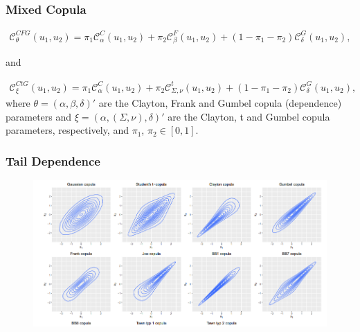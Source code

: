 \documentclass[pdf,10pt,xcolor=dvipsnames,hide notes]{beamer}
\begin{document}
\begin{frame}[label=frame4i]
\frametitle{Mixed Copula}

\begin{eqnarray*}
	\mathcal{C}_{\theta}^{CFG}\left(u_{1},u_{2}\right)=\pi_{1}\mathcal{C}_{\alpha}^{C}\left(u_{1},u_{2}\right)+\pi_{2}\mathcal{C}_{\beta}^{F}\left(u_{1},u_{2}\right)+\left(1-\pi_{1}-\pi_{2}\right)\mathcal{C}_{\delta}^{G}\left(u_{1},u_{2}\right),
\end{eqnarray*}

and

\begin{eqnarray*}
	\mathcal{C}_{\xi}^{CtG}\left(u_{1},u_{2}\right)=\pi_{1}\mathcal{C}_{\alpha}^{C}\left(u_{1},u_{2}\right)+\pi_{2}\mathcal{C}_{\Sigma,\nu}^{t}\left(u_{1},u_{2}\right)+\left(1-\pi_{1}-\pi_{2}\right)\mathcal{C}_{\delta}^{G}\left(u_{1},u_{2}\right),
\end{eqnarray*}
where $\theta=\left(\alpha,\beta,\delta\right)'$ are the Clayton, Frank and Gumbel copula (dependence) parameters and $\xi=\left(\alpha,(\Sigma,\nu),\delta\right)'$ are the Clayton, t and Gumbel copula parameters, respectively, and $\pi_{1}$, $\pi_{2} \in [0,1]$. 

\end{frame}

\begin{frame}
\frametitle{Tail Dependence}

\begin{figure}[htbp]
	\centering
	\includegraphics[scale=0.5]{taildep.png}
	\label{fig:fig1}
\end{figure}

\end{frame}


\section{}	
\end{document}
